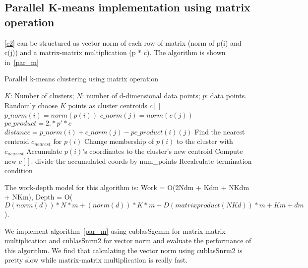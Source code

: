 \subsection{Parallel K-means implementation using matrix operation}
\ref{e2} can be structured as vector norm of each row of matrix (norm of p(i) and c(j)) and
a matrix-matrix multiplication (p * c). The algorithm is shown in~\ref{par_m}
\begin{algorithm}[!h]
  \caption{Parallel k-means clustering using matrix operation} \label{par_m}
  \begin{algorithmic}[1]
    \INPUT $K$: Number of clusters; $N$: number of d-dimensional data points; $p$: data points.
     \label{alg:pm}
    \State Randomly choose $K$ points as cluster centroids $c[]$
    \State $p\_norm(i) = norm(p(i))$
    \EndFor
    \State $c\_norm(j) = norm(c(j))$
    \EndFor
    \State $pc\_product = 2 .* p' * c$
    \State $distance = p\_norm(i) + c\_norm(j) - pc\_product(i)(j)$
    \EndFor
    \State Find the nearest centroid $c_{nearest}$ for $p(i)$
    \State Change membership of $p(i)$ to the cluster with $c_{nearest}$
    \State Accumulate $p(i)$'s coordinates to the cluster's new centroid
    \EndParFor
    \State Compute new $c[]$: divide the accumulated coords by num\_points
    \State Recalculate termination condition
    \EndWhile
    \EndFunction
  \end{algorithmic}
\end{algorithm}
The work-depth model for this algorithm is: Work = O(2Ndm + Kdm + NKdm + NKm), Depth = O($D(norm(d))*N*m + (norm(d))*K*m + D(matrix product(NKd))*m + Km + dm$).

We implement algorithm~\ref{par_m} using cublasSgemm for matrix matrix multiplication and cublasSnrm2
for vector norm and evaluate the performance of this algorithm.
We find that calculating the vector norm using cublasSnrm2 is pretty slow while matrix-matrix multiplication is really fast.

